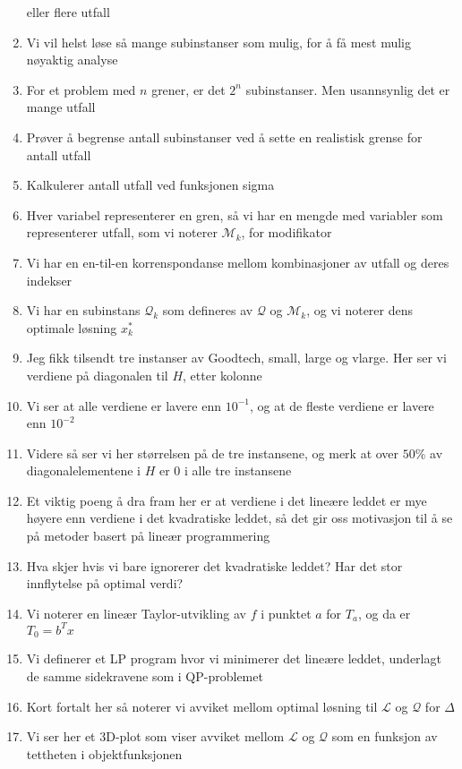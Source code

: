 \documentclass[a4paper,twocolumn]{report}
\begin{document}
\begin{enumerate}
      eller flere utfall
\item Vi vil helst løse så mange subinstanser som mulig, for å få mest mulig
      nøyaktig analyse
\item For et problem med $n$ grener, er det $2^n$ subinstanser. Men usannsynlig
      det er mange utfall
\item Prøver å begrense antall subinstanser ved å sette en realistisk grense
      for antall utfall
\item Kalkulerer antall utfall ved funksjonen sigma
\item Hver variabel representerer en gren, så vi har en mengde med variabler
      som representerer utfall, som vi noterer $\mathcal{M}_k$, for
      modifikator
\item Vi har en en-til-en korrenspondanse mellom kombinasjoner av utfall og
      deres indekser
\item Vi har en subinstans $\mathcal{Q}_k$ som defineres av $\mathcal{Q}$ og
      $\mathcal{M}_k$, og vi noterer dens optimale løsning $x_k^*$
\item Jeg fikk tilsendt tre instanser av Goodtech, small, large og vlarge. Her
      ser vi verdiene på diagonalen til $H$, etter kolonne
\item Vi ser at alle verdiene er lavere enn $10^{-1}$, og at de fleste verdiene
      er lavere enn $10^{-2}$
\item Videre så ser vi her størrelsen på de tre instansene, og merk at over
      $50\%$ av diagonalelementene i $H$ er $0$ i alle tre instansene
\item Et viktig poeng å dra fram her er at verdiene i det lineære leddet er mye
      høyere enn verdiene i det kvadratiske leddet, så det gir oss motivasjon
      til å se på metoder basert på lineær programmering
\item Hva skjer hvis vi bare ignorerer det kvadratiske leddet? Har det stor
      innflytelse på optimal verdi?
\item Vi noterer en lineær Taylor-utvikling av $f$ i punktet $a$ for $T_a$,
      og da er $T_0 = b^T x$
\item Vi definerer et LP program hvor vi minimerer det lineære leddet,
      underlagt de samme sidekravene som i QP-problemet
\item Kort fortalt her så noterer vi avviket mellom optimal løsning til
      $\mathcal{L}$ og $\mathcal{Q}$ for $\Delta$
\item Vi ser her et 3D-plot som viser avviket mellom $\mathcal{L}$ og
      $\mathcal{Q}$ som en funksjon av tettheten i objektfunksjonen

\end{enumerate}
\end{document}
